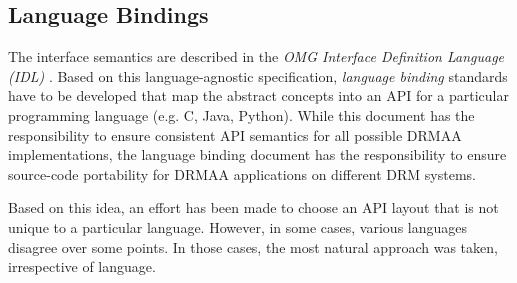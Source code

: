\documentclass{article}
\newcommand{\rat}[1]{}
\begin{document}
\rat{
As one example, queues can be either treated as representation of execution hosts (Sun Grid Engine) or as central waiting line located at the scheduler (LSF).  Slots have a meaning in GLUE, but we intentionally stick with the opaque concept approach.
}

\subsection{Language Bindings}
\label{sec:langbind}

The interface semantics are described in the \emph{OMG Interface Definition Language (IDL)} \cite{idl}. Based on this language-agnostic specification, \emph{language binding} standards have to be developed that map the abstract concepts into an API for a particular programming language (e.g. C, Java, Python). While this document has the responsibility to ensure consistent API semantics for all possible DRMAA implementations, the language binding document has the responsibility to ensure source-code portability for DRMAA applications on different DRM systems.

Based on this idea, an effort has been made to choose an API layout that is not unique to a particular language. However, in some cases, various languages disagree over some points. In those cases, the most natural approach was taken, irrespective of language.
\end{document}
